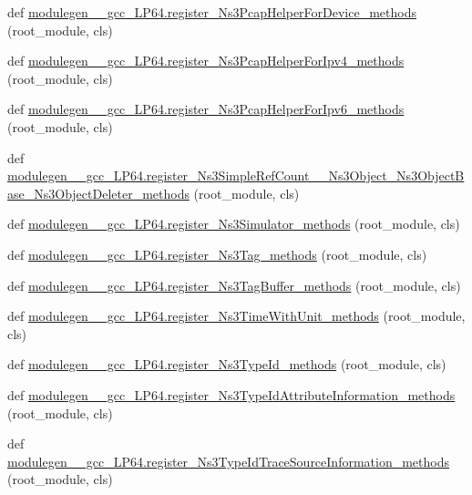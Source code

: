 \begin{DoxyCompactItemize}
\item 
def \hyperlink{namespacemodulegen____gcc__LP64_ac953f061a33acecaa39b9f1ba873ba21}{modulegen\+\_\+\+\_\+gcc\+\_\+\+L\+P64.\+register\+\_\+\+Ns3\+Pcap\+Helper\+For\+Device\+\_\+methods} (root\+\_\+module, cls)
\item 
def \hyperlink{namespacemodulegen____gcc__LP64_ac1e51e24c1991171fe0e2a373b24caf4}{modulegen\+\_\+\+\_\+gcc\+\_\+\+L\+P64.\+register\+\_\+\+Ns3\+Pcap\+Helper\+For\+Ipv4\+\_\+methods} (root\+\_\+module, cls)
\item 
def \hyperlink{namespacemodulegen____gcc__LP64_ad9e0ba978e6a57f91173039a920d884b}{modulegen\+\_\+\+\_\+gcc\+\_\+\+L\+P64.\+register\+\_\+\+Ns3\+Pcap\+Helper\+For\+Ipv6\+\_\+methods} (root\+\_\+module, cls)
\item 
def \hyperlink{namespacemodulegen____gcc__LP64_a3df0bc75eda374a47e4888b021d60870}{modulegen\+\_\+\+\_\+gcc\+\_\+\+L\+P64.\+register\+\_\+\+Ns3\+Simple\+Ref\+Count\+\_\+\+\_\+\+Ns3\+Object\+\_\+\+Ns3\+Object\+Base\+\_\+\+Ns3\+Object\+Deleter\+\_\+methods} (root\+\_\+module, cls)
\item 
def \hyperlink{namespacemodulegen____gcc__LP64_ac43918825b198877acafaae4cbc1c9e0}{modulegen\+\_\+\+\_\+gcc\+\_\+\+L\+P64.\+register\+\_\+\+Ns3\+Simulator\+\_\+methods} (root\+\_\+module, cls)
\item 
def \hyperlink{namespacemodulegen____gcc__LP64_a8667a8c9dd38f2a77c66b6851250f1cb}{modulegen\+\_\+\+\_\+gcc\+\_\+\+L\+P64.\+register\+\_\+\+Ns3\+Tag\+\_\+methods} (root\+\_\+module, cls)
\item 
def \hyperlink{namespacemodulegen____gcc__LP64_a77191b364d09e6ccbe9b803bee493b0a}{modulegen\+\_\+\+\_\+gcc\+\_\+\+L\+P64.\+register\+\_\+\+Ns3\+Tag\+Buffer\+\_\+methods} (root\+\_\+module, cls)
\item 
def \hyperlink{namespacemodulegen____gcc__LP64_a054aa04457970b1c07a67d49cafee187}{modulegen\+\_\+\+\_\+gcc\+\_\+\+L\+P64.\+register\+\_\+\+Ns3\+Time\+With\+Unit\+\_\+methods} (root\+\_\+module, cls)
\item 
def \hyperlink{namespacemodulegen____gcc__LP64_adea84ddbc489895d2347d15ea1328bc0}{modulegen\+\_\+\+\_\+gcc\+\_\+\+L\+P64.\+register\+\_\+\+Ns3\+Type\+Id\+\_\+methods} (root\+\_\+module, cls)
\item 
def \hyperlink{namespacemodulegen____gcc__LP64_aae2764584a69687644f37b42586364df}{modulegen\+\_\+\+\_\+gcc\+\_\+\+L\+P64.\+register\+\_\+\+Ns3\+Type\+Id\+Attribute\+Information\+\_\+methods} (root\+\_\+module, cls)
\item 
def \hyperlink{namespacemodulegen____gcc__LP64_af7ee3e03193815233627c2c4b4b2ebf6}{modulegen\+\_\+\+\_\+gcc\+\_\+\+L\+P64.\+register\+\_\+\+Ns3\+Type\+Id\+Trace\+Source\+Information\+\_\+methods} (root\+\_\+module, cls)

\end{DoxyCompactItemize}
